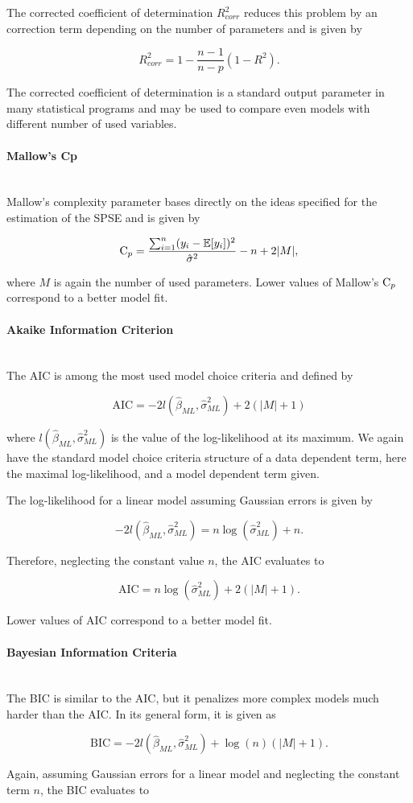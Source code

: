 \documentclass[10pt,a4paper]{article}
\newcommand{\subsubsubsection}[1]{\paragraph{#1}\mbox{}\\}
\begin{document}
The corrected coefficient of determination $R_{corr}^2$ reduces this problem by an correction term depending on the  number of parameters and is given by

$$R_{corr}^2 = 1 - \frac{n-1}{n-p}(1-R^2). $$

The corrected coefficient of determination is a standard output parameter in many statistical programs and may be used to compare even models with different number of used variables. 

\subsubsubsection{Mallow's Cp}

Mallow's complexity parameter bases directly on the ideas specified for the estimation of the SPSE and is given by

$$\text C_p = \frac{\sum_{i=1}^n (y_i - \mathbb{E}[y_i])^2}{\hat \sigma^2} - n + 2 \vert M \vert,$$

where $M$ is again the number of used parameters. Lower values of Mallow's $\text C_p$ correspond to a better model fit.

\subsubsubsection{Akaike Information Criterion}

The AIC is among the most used model choice criteria and defined by

$$\text{AIC} = -2 l(\hat \beta_{ML}, \hat \sigma^2_{ML}) + 2(\vert M \vert +1)$$

where $l(\hat \beta_{ML}, \hat \sigma^2_{ML})$ is the value of the log-likelihood at its maximum. We again have the standard model choice criteria structure of a data dependent term, here the maximal log-likelihood, and a model dependent term given. 

The log-likelihood for a linear model assuming Gaussian errors is given by

$$-2l(\hat\beta_{ML}, \hat \sigma_{ML}^2) = n \log(\hat \sigma_{ML}^2) + n.$$

Therefore, neglecting the constant value $n$, the AIC evaluates to

$$\text{AIC} = n \log(\hat \sigma^2_{ML}) + 2(\vert M \vert + 1).$$

Lower values of AIC correspond to a better model fit. 

\subsubsubsection{Bayesian Information Criteria}

The BIC is similar to the AIC, but it penalizes more complex models much harder than the AIC. In its general form, it is given as 

$$\text{BIC} = -2l(\hat\beta_{ML}, \hat \sigma^2_{ML}) + \log(n) (\vert M \vert + 1).$$

Again, assuming Gaussian errors for a linear model and neglecting the constant term $n$, the BIC evaluates to
\end{document}
